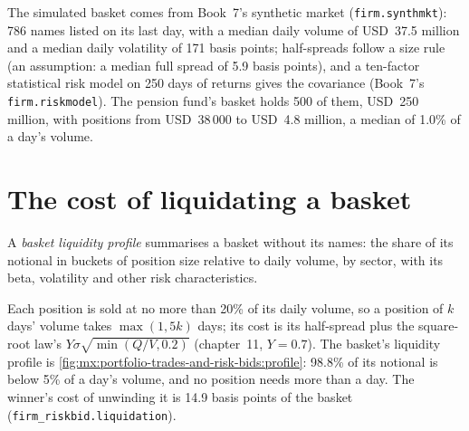 The simulated basket comes from Book~7's synthetic market (\texttt{firm.synthmkt}): 786 names listed on its last day, with a median daily volume of
USD~37.5 million and a median daily volatility of 171 basis points; half-spreads follow a size rule (an assumption: a median full spread of 5.9 basis
points), and a ten-factor statistical risk model on 250 days of returns gives the covariance (Book~7's \texttt{firm.riskmodel}). The pension fund's
basket holds 500 of them, USD~250 million, with positions from USD~38\,000 to USD~4.8 million, a median of 1.0\% of a day's volume.

\section{The cost of liquidating a basket}

\begin{definition}\label{def:mx:portfolio-trades-and-risk-bids:profile}
A \emph{basket liquidity profile} summarises a basket without its names: the share of its notional in buckets of
position size relative to daily volume, by sector, with its beta, volatility and other risk characteristics.
\end{definition}

Each position is sold at no more than 20\% of its daily volume, so a position of $k$ days' volume takes $\max(1,5k)$ days; its cost is its
half-spread plus the square-root law's $Y\sigma\sqrt{\min(Q/V,0.2)}$ (chapter~11, $Y=0.7$). The basket's liquidity profile is
\cref{fig:mx:portfolio-trades-and-risk-bids:profile}: 98.8\% of its notional is below 5\% of a day's volume, and no position needs more than a day. The
winner's cost of unwinding it is 14.9 basis points of the basket (\texttt{firm\_riskbid.liquidation}).

\begin{omfigure}

\label{fig:mx:portfolio-trades-and-risk-bids:profile}
\end{omfigure}

